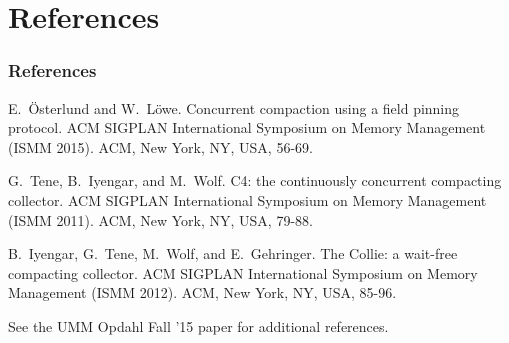 \documentclass{beamer}
\newcommand{\linespace}{\vskip 0.25cm}
\begin{document}
\section*{References}

\begin{frame} 
	\frametitle{References} 
	
%	
%	
%  
%	

\begin{thebibliography}{lskdjf}

E.~\"{O}sterlund and W.~L\"{o}we.
\newblock Concurrent compaction using a field pinning protocol. 
 ACM SIGPLAN International Symposium on Memory Management (ISMM 2015). ACM, New York, NY, USA, 56-69.

G.~Tene, B.~Iyengar, and M.~Wolf.
\newblock C4: the continuously concurrent compacting collector.
 ACM SIGPLAN International Symposium on Memory Management (ISMM 2011). ACM, New York, NY, USA, 79-88.

B.~Iyengar, G.~Tene, M.~Wolf, and E.~Gehringer.
\newblock The Collie: a wait-free compacting collector.
 ACM SIGPLAN International Symposium on Memory Management (ISMM 2012). ACM, New York, NY, USA, 85-96.

\linespace
\begin{center}
\color{black}See the UMM Opdahl Fall '15 paper for additional references.
\end{center}


\end{thebibliography}

\end{frame} 
\end{document}
